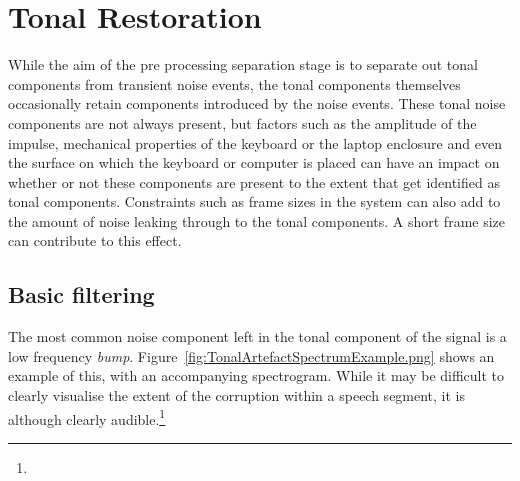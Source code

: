 %

\section{Tonal Restoration}\label{sec:TonalFiltering}
While the aim of the pre processing separation stage is to separate out tonal components from transient noise events, the tonal components themselves occasionally retain components introduced by the noise events. These tonal noise components are not always present, but factors such as the amplitude of the impulse, mechanical properties of the keyboard or the laptop enclosure and even the surface on which the keyboard or computer is placed can have an impact on whether or not these components are present to the extent that get identified as tonal components. Constraints such as frame sizes in the system can also add to the amount of noise leaking through to the tonal components. A short frame size can contribute to this effect.

\subsection{Basic filtering}\label{sec:TonalFiltering}
The most common noise component left in the tonal component of the signal is a low frequency \emph{bump}. Figure~\ref{fig:TonalArtefactSpectrumExample.png} shows an example of this, with an accompanying spectrogram. While it may be difficult to clearly visualise the extent of the corruption within a speech segment, it is although clearly audible.\footnote{}

